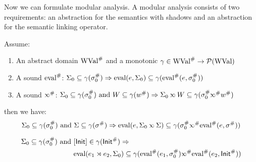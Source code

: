 Now we can formulate modular analysis.
A modular analysis consists of two requirements: an abstraction for the semantics with shadows and an abstraction for the semantic linking operator.
\begin{thm}
  Assume:
  \begin{enumerate}
    \item An abstract domain ${\textnormal{WVal}}^{\#}$ and a monotonic $\gamma\in{\textnormal{WVal}}^{\#}\rightarrow\mathcal{P}({\textnormal{WVal}})$
    \item A sound ${\textnormal{eval}}^{\#}$: $\Sigma_0\subseteq\gamma({\sigma}^{\#}_0)\Rightarrow\textnormal{eval}(e,\Sigma_0)\subseteq\gamma({\textnormal{eval}}^{\#}(e,{\sigma}^{\#}_0))$
    \item A sound $\Abs\semlink$: $\Sigma_0\subseteq\gamma(\Abs\ctx_0)\textnormal{ and }W\subseteq\gamma(\Abs{w})\Rightarrow\Sigma_0\semlink W\subseteq\gamma(\Abs\ctx_0\Abs\semlink\Abs{w})$
  \end{enumerate}
  then we have:
  \[\Sigma_0\subseteq\gamma(\Abs\ctx_0)\textnormal{ and }\Sigma\subseteq\gamma(\Abs\ctx)\Rightarrow\eval(e,\Sigma_0\semlink\Sigma)\subseteq\gamma(\Abs\ctx_0\Abs\semlink\Abs\eval(e,\Abs\ctx))\]
\end{thm}
\begin{cor}
  \begin{align*}
    \Sigma_0\subseteq\gamma(\Abs\ctx_0)\textnormal{ and } & [\InitE]\in\gamma(\Abs\InitE)\Rightarrow                                                                       \\
                                                          & \eval(e_1\synlink e_2,\Sigma_0)\subseteq\gamma(\Abs\eval(e_1,\Abs\ctx_0)\Abs\semlink\Abs\eval(e_2,\Abs\InitE))
  \end{align*}
\end{cor}
